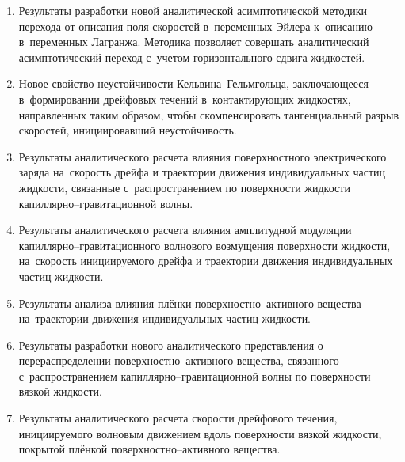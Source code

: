 \begin{enumerate}
% 
  	  \item Результаты разработки новой аналитической асимптотической методики перехода от описания поля скоростей в~переменных Эйлера к~описанию в~переменных Лагранжа. Методика позволяет совершать аналитический асимптотический переход с~учетом горизонтального сдвига жидкостей.
  	\item Новое свойство неустойчивости Кельвина--Гельмгольца, заключающееся в~формировании дрейфовых течений в~контактирующих жидкостях, направленных таким образом, чтобы скомпенсировать тангенциальный разрыв скоростей, инициировавший неустойчивость.
  	\item Результаты аналитического расчета влияния поверхностного электрического заряда на~скорость дрейфа и траектории движения индивидуальных частиц жидкости, связанные с~распространением по поверхности жидкости капиллярно--гравитационной волны.
  	\item Результаты аналитического расчета влияния амплитудной модуляции капиллярно--гравитационного волнового возмущения поверхности жидкости, на~скорость инициируемого дрейфа и траектории движения индивидуальных частиц жидкости.
  	\item Результаты анализа влияния плёнки поверхностно--активного вещества на~траектории движения индивидуальных частиц жидкости.
  	\item Результаты разработки нового аналитического представления о перераспределении поверхностно--активного вещества, связанного с~распространением капиллярно--гравитационной волны по поверхности вязкой жидкости.
  	\item Результаты аналитического расчета скорости дрейфового течения, инициируемого волновым движением вдоль поверхности вязкой жидкости, покрытой плёнкой поверхностно--активного вещества.
   
\end{enumerate}

